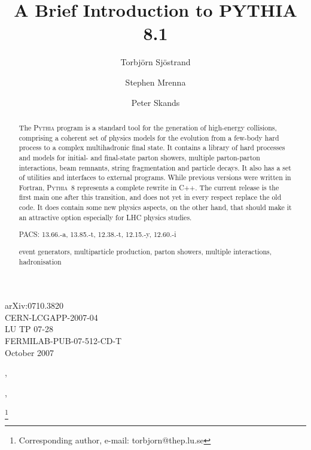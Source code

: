 \documentclass{elsartmod}
\begin{document}
\begin{frontmatter}
 
\begin{flushright}
arXiv:0710.3820\\ 
CERN-LCGAPP-2007-04\\
LU TP 07-28\\
FERMILAB-PUB-07-512-CD-T\\
October 2007\\
\end{flushright}

\title{A Brief Introduction to PYTHIA 8.1}

\author[a,b]{Torbj\"orn Sj\"ostrand},
\author[c]{Stephen Mrenna},
\author[a,c]{Peter Skands}

\thanks[author]{Corresponding author, e-mail: torbjorn@thep.lu.se}

\address[a]{CERN/PH, CH--1211 Geneva 23, Switzerland}
\address[b]{Department of Theoretical Physics, Lund University,\\ 
S\"olvegatan 14A, SE-223 62 Lund, Sweden}
\address[c]{Fermi National Accelerator Laboratory, Batavia, 
IL  60510, USA}

\begin{abstract}
The \textsc{Pythia} program is a standard tool for the generation 
of high-energy collisions, comprising a coherent set of physics
models for the evolution from a few-body hard process to a complex
multihadronic final state. It contains a library of hard processes 
and models for initial- and final-state parton showers, multiple 
parton-parton interactions, beam remnants, string fragmentation and 
particle decays. It also has a set of utilities and interfaces to 
external programs. While previous versions were written in Fortran, 
\textsc{Pythia}~8 represents a complete rewrite in C++. The current 
release is the first main one after this transition, and does not yet 
in every respect replace the old code. It does contain some new physics 
aspects, on the other hand, that should make it an attractive option 
especially for LHC physics studies.
\begin{flushleft}
PACS: 13.66.-a, 13.85.-t, 12.38.-t, 12.15.-y, 12.60.-i
\end{flushleft}

\begin{keyword}
event generators, multiparticle production, 
parton showers, multiple interactions, hadronisation
\end{keyword}

\end{abstract}


\end{frontmatter}
\end{document}
